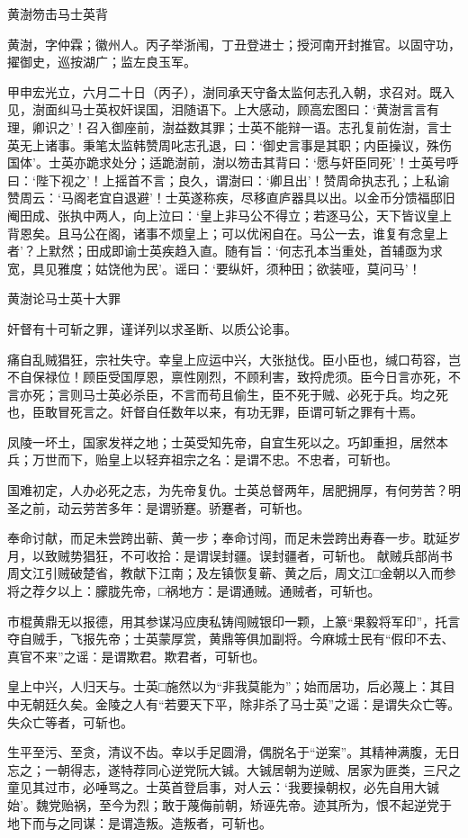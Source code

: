 \documentclass[]{article}
\begin{document}
黄澍笏击马士英背

黄澍，字仲霖；徽州人。丙子举浙闱，丁丑登进士；授河南开封推官。以固守功，擢御史，巡按湖广；监左良玉军。

甲申宏光立，六月二十日（丙子），澍同承天守备太监何志孔入朝，求召对。既入见，澍面纠马士英权奸误国，泪随语下。上大感动，顾高宏图曰：`黄澍言言有理，卿识之'！召入御座前，澍益数其罪；士英不能辩一语。志孔复前佐澍，言士英无上诸事。秉笔太监韩赞周叱志孔退，曰：`御史言事是其职；内臣操议，殊伤国体'。士英亦跪求处分；适跪澍前，澍以笏击其背曰：`愿与奸臣同死'！士英号呼曰：`陛下视之'！上摇首不言；良久，谓澍曰：`卿且出'！赞周命执志孔；上私谕赞周云：`马阁老宜自退避'！士英遂称疾，尽移直庐器具以出。以金币分馈福邸旧阉田成、张执中两人，向上泣曰：`皇上非马公不得立；若逐马公，天下皆议皇上背恩矣。且马公在阁，诸事不烦皇上；可以优闲自在。马公一去，谁复有念皇上者'？上默然；田成即谕士英疾趋入直。随有旨：`何志孔本当重处，首辅亟为求宽，具见雅度；姑饶他为民'。谣曰：`要纵奸，须种田；欲装哑，莫问马'！

黄澍论马士英十大罪

奸督有十可斩之罪，谨详列以求圣断、以质公论事。

痛自乱贼猖狂，宗社失守。幸皇上应运中兴，大张挞伐。臣小臣也，缄口苟容，岂不自保禄位！顾臣受国厚恩，禀性刚烈，不顾利害，致捋虎须。臣今日言亦死，不言亦死；言则马士英必杀臣，不言而苟且偷生，臣不死于贼、必死于兵。均之死也，臣敢冒死言之。奸督自任数年以来，有功无罪，臣谓可斩之罪有十焉。

凤陵一坏土，国家发祥之地；士英受知先帝，自宜生死以之。巧卸重担，居然本兵；万世而下，贻皇上以轻弃祖宗之名：是谓不忠。不忠者，可斩也。

国难初定，人办必死之志，为先帝复仇。士英总督两年，居肥拥厚，有何劳苦？明圣之前，动云劳苦多年：是谓骄蹇。骄蹇者，可斩也。

奉命讨献，而足未尝跨出蕲、黄一步；奉命讨闯，而足未尝跨出寿春一步。耽延岁月，以致贼势猖狂，不可收拾：是谓误封疆。误封疆者，可斩也。
献贼兵部尚书周文江引贼破楚省，教献下江南；及左镇恢复蕲、黄之后，周文江□金朝以入而参将之荐夕以上：朦胧先帝，□祸地方：是谓通贼。通贼者，可斩也。

市棍黄鼎无以报德，用其参谋冯应庚私铸闯贼银印一颗，上篆``果毅将军印''，托言夺自贼手，飞报先帝；士英蒙厚赏，黄鼎等俱加副将。今麻城士民有``假印不去、真官不来''之谣：是谓欺君。欺君者，可斩也。

皇上中兴，人归天与。士英□施然以为``非我莫能为''；始而居功，后必蔑上：其目中无朝廷久矣。金陵之人有``若要天下平，除非杀了马士英''之谣：是谓失众亡等。失众亡等者，可斩也。

生平至污、至贪，清议不齿。幸以手足圆滑，偶脱名于``逆案''。其精神满腹，无日忘之；一朝得志，遂特荐同心逆党阮大铖。大铖居朝为逆贼、居家为匪类，三尺之童见其过市，必唾骂之。士英首登启事，对人云：`我要操朝权，必先自用大铖始'。魏党贻祸，至今为烈；敢于蔑侮前朝，矫诬先帝。迹其所为，恨不起逆党于地下而与之同谋：是谓造叛。造叛者，可斩也。
\end{document}
